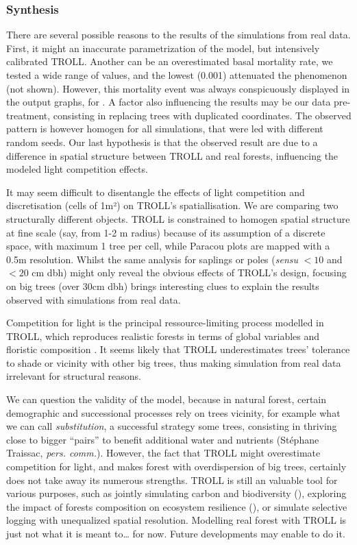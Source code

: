 \documentclass[12pt,]{article}
\theoremstyle{definition}
\theoremstyle{definition}
\theoremstyle{definition}
\theoremstyle{remark}
\begin{document}
\subsubsection{Synthesis}\label{synthesis}

There are several possible reasons to the results of the simulations
from real data. First, it might an inaccurate parametrization of the
model, but \citet{Marechaux2017a} intensively calibrated TROLL. Another
can be an overestimated basal mortality rate, we tested a wide range of
values, and the lowest (0.001) attenuated the phenomenon (not shown).
However, this mortality event was always conspicuously displayed in the
output graphs, for . A factor also influencing the results may be our
data pre-treatment, consisting in replacing trees with duplicated
coordinates. The observed pattern is however homogen for all
simulations, that were led with different random seeds. Our last
hypothesis is that the observed result are due to a difference in
spatial structure between TROLL and real forests, influencing the
modeled light competition effects.

It may seem difficult to disentangle the effects of light competition
and discretisation (cells of 1m²) on TROLL's spatiallisation. We are
comparing two structurally different objects. TROLL is constrained to
homogen spatial structure at fine scale (say, from 1-2 m radius) because
of its assumption of a discrete space, with maximum 1 tree per cell,
while Paracou plots are mapped with a 0.5m resolution. Whilst the same
analysis for saplings or poles (\emph{sensu} \(<10\) and \(<20\) cm dbh)
might only reveal the obvious effects of TROLL's design, focusing on big
trees (over 30cm dbh) brings interesting clues to explain the results
observed with simulations from real data.

Competition for light is the principal ressource-limiting process
modelled in TROLL, which reproduces realistic forests in terms of global
variables and floristic composition \citep[see][]{Marechaux2017}. It
seems likely that TROLL underestimates trees' tolerance to shade or
vicinity with other big trees, thus making simulation from real data
irrelevant for structural reasons.

We can question the validity of the model, because in natural forest,
certain demographic and successional processes rely on trees vicinity,
for example what we can call \emph{substitution}, a successful strategy
some trees, consisting in thriving close to bigger ``pairs'' to benefit
additional water and nutrients (Stéphane Traissac, \emph{pers. comm.}).
However, the fact that TROLL might overestimate competition for light,
and makes forest with overdispersion of big trees, certainly does not
take away its numerous strengths. TROLL is still an valuable tool for
various purposes, such as jointly simulating carbon and biodiversity
(\citet{Marechaux2017}), exploring the impact of forests composition on
ecosystem resilience (\citet{Schmitt2017}), or simulate selective
logging with unequalized spatial resolution. Modelling real forest with
TROLL is just not what it is meant to\ldots{} for now. Future
developments may enable to do it.
\end{document}
